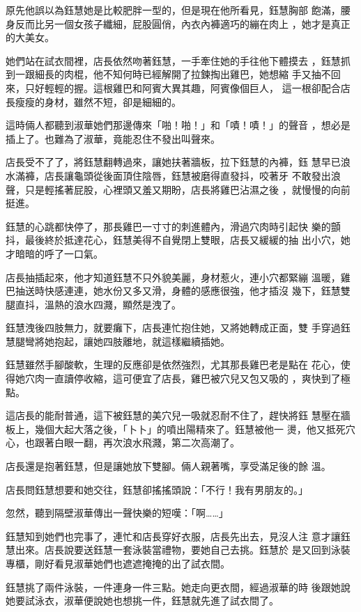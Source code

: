 原先他誤以為鈺慧她是比較肥胖一型的，但是現在他所看見，鈺慧胸部
飽滿，腰身反而比另一個女孩子纖細，屁股圓俏，內衣內褲適巧的繃在肉上
，她才是真正的大美女。

她們站在試衣間裡，店長依然吻著鈺慧，一手牽住她的手往他下體摸去
，鈺慧抓到一跟細長的肉棍，他不知何時已經解開了拉鍊掏出雞巴，她想縮
手又抽不回來，只好輕輕的握。這根雞巴和阿賓大異其趣，阿賓像個巨人，
這一根卻配合店長瘦瘦的身材，雖然不短，卻是細細的。

這時倆人都聽到淑華她們那邊傳來「啪！啪！」和「嘖！嘖！」的聲音
，想必是插上了。也難為了淑華，竟能忍住不發出叫聲來。

店長受不了了，將鈺慧翻轉過來，讓她扶著牆板，拉下鈺慧的內褲，鈺
慧早已浪水滿褲，店長讓龜頭從後面頂住陰唇，鈺慧被磨得直發抖，咬著牙
不敢發出浪聲，只是輕搖著屁股，心裡頭又羞又期盼，店長將雞巴沾濕之後
，就慢慢的向前挺進。

鈺慧的心跳都快停了，那長雞巴一寸寸的刺進體內，滑過穴肉時引起快
樂的顫抖，最後終於抵達花心，鈺慧美得不自覺閉上雙眼，店長又緩緩的抽
出小穴，她才暗暗的呼了一口氣。

店長抽插起來，他才知道鈺慧不只外貌美麗，身材惹火，連小穴都緊繃
溫暖，雞巴抽送時快感連連，她水份又多又滑，身體的感應很強，他才插沒
幾下，鈺慧雙腿直抖，溫熱的浪水四濺，顯然是洩了。

鈺慧洩後四肢無力，就要癱下，店長連忙抱住她，又將她轉成正面，雙
手穿過鈺慧腿彎將她抱起，讓她四肢離地，就這樣繼續插她。

鈺慧雖然手腳酸軟，生理的反應卻是依然強烈，尤其那長雞巴老是點在
花心，使得她穴肉一直讀停收縮，這可便宜了店長，雞巴被穴兒又包又吸的
，爽快到了極點。

這店長的能耐普通，這下被鈺慧的美穴兒一吸就忍耐不住了，趕快將鈺
慧壓在牆板上，幾個大起大落之後，「卜卜」的噴出陽精來了。鈺慧被他一
燙，他又抵死穴心，也跟著白眼一翻，再次浪水飛濺，第二次高潮了。

店長還是抱著鈺慧，但是讓她放下雙腳。倆人親著嘴，享受滿足後的餘
溫。

店長問鈺慧想要和她交往，鈺慧卻搖搖頭說：「不行！我有男朋友的。」

忽然，聽到隔壁淑華傳出一聲快樂的短嘆：「啊……」

鈺慧知到她們也完事了，連忙和店長穿好衣服，店長先出去，見沒人注
意才讓鈺慧出來。店長說要送鈺慧一套泳裝當禮物，要她自己去挑。鈺慧於
是又回到泳裝專櫃，剛好看見淑華她們也遮遮掩掩的出了試衣間。

鈺慧挑了兩件泳裝，一件連身一件三點。她走向更衣間，經過淑華的時
後跟她說她要試泳衣，淑華便說她也想挑一件，鈺慧就先進了試衣間了。

